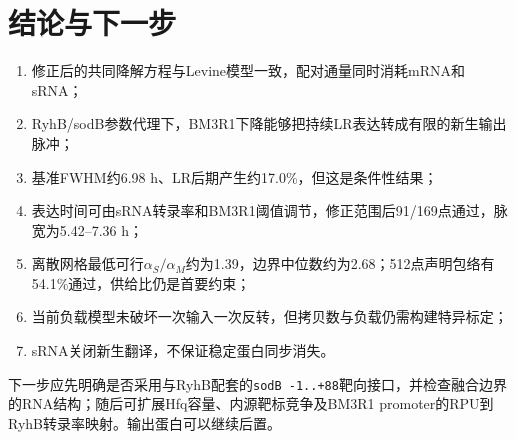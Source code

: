 \documentclass[UTF8,a4paper,11pt,fontset=windows]{ctexart}
\begin{document}
\section{结论与下一步}
\begin{enumerate}
\item 修正后的共同降解方程与Levine模型一致，配对通量同时消耗mRNA和sRNA；
\item RyhB/sodB参数代理下，BM3R1下降能够把持续LR表达转成有限的新生输出脉冲；
\item 基准FWHM约6.98 h、LR后期产生约17.0\%，但这是条件性结果；
\item 表达时间可由sRNA转录率和BM3R1阈值调节，修正范围后91/169点通过，脉宽为5.42--7.36 h；
\item 离散网格最低可行$\alpha_S/\alpha_M$约为1.39，边界中位数约为2.68；512点声明包络有54.1\%通过，供给比仍是首要约束；
\item 当前负载模型未破坏一次输入一次反转，但拷贝数与负载仍需构建特异标定；
\item sRNA关闭新生翻译，不保证稳定蛋白同步消失。
\end{enumerate}

下一步应先明确是否采用与RyhB配套的\nolinkurl{sodB -1..+88}靶向接口，并检查融合边界的RNA结构；随后可扩展Hfq容量、内源靶标竞争及BM3R1 promoter的RPU到RyhB转录率映射。输出蛋白可以继续后置。
\end{document}
